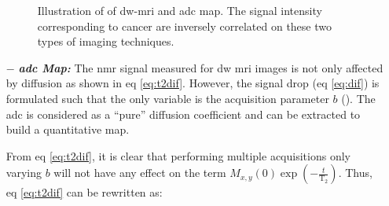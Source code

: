 \begin{enumerate}[leftmargin=*]
\begin{figure}
	\hspace*{\fill}
	\caption{Illustration of of \ac{dw}-\ac{mri} and \ac{adc} map. The signal intensity corresponding to cancer are inversely correlated on these two types of imaging techniques.}
	\label{fig:dwi}
\end{figure}

\item[$-$] \textbf{\textit{\ac{adc} Map:}} The \ac{nmr} signal measured for \ac{dw} \ac{mri} images is not only affected by diffusion as shown in \acs{eq} \eqref{eq:t2dif}. However, the signal drop (\acs{eq} \eqref{eq:dif}) is formulated such that the only variable is the acquisition parameter $b$ (\cite{LeBihan1986}). The \ac{adc} is considered as a ``pure'' diffusion coefficient and can be extracted to build a quantitative map.

From \acs{eq} \ref{eq:t2dif}, it is clear that performing multiple acquisitions only varying $b$ will not have any effect on the term  $M_{x,y}(0) \exp \left( - \frac{t}{\text{T}_2} \right)$. Thus, \acs{eq} \ref{eq:t2dif} can be rewritten as:


\end{enumerate}
